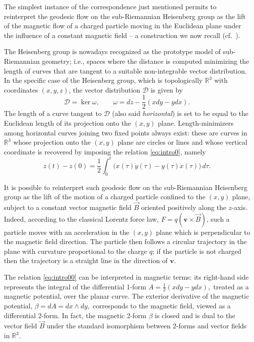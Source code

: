 \documentclass{amsart}
\theoremstyle{plain}
\theoremstyle{definition}
\theoremstyle{remark}
\newcommand{\R}{\mathbb{R}}
\newcommand{\sr}{sub-{R}ie\-man\-nian }
\newcommand{\distr}{\mathcal{D}}								%
\begin{document}
The simplest instance of the correspondence just mentioned permits to reinterpret the geodesic flow on the sub-Riemannian Heisenberg group as the lift of the magnetic flow of a charged particle moving in the Euclidean plane under the influence of a constant magnetic field -- a construction we now recall (cf.\ \cite[Section~4.4.2]{thebook}).


\smallskip
The Heisenberg group is nowadays recognized as the prototype model of \sr geometry; i.e., spaces where the distance is computed minimizing the length of curves that are tangent to a suitable non-integrable vector distribution.  In the specific case of the Heisenberg group, which is topologically $\R^{3}$ with coordinates $(x,y,z)$, the vector distribution $\distr$ is given by
 \begin{equation} \label{eq:intro0}
	\distr=\ker \omega,\qquad \omega=dz-\frac{1}{2}(xdy-ydx). 
 \end{equation}
The length of a curve tangent to $\distr$ (also said \emph{horizontal}) is set to be equal to the Euclidean length of its projection onto the $(x,y)$ plane. Length-minimizers among horizontal curves joining two fixed points always exist: these are curves in $\R^{3}$ whose projection onto the $(x,y)$ plane are circles or lines and whose vertical coordinate is recovered by imposing the relation \eqref{eq:intro0}, namely
 \begin{equation} \label{eq:intro00}
	 z(t)-z(0)=\frac{1}{2}\int_{0}^{t} \big( x(\tau)\dot y(\tau)-y(\tau)\dot x(\tau) \big) \, d\tau. 
 \end{equation}
 


It is possible to reinterpret such geodesic flow on the \sr Heisenberg group as the lift of the motion of a charged particle confined to the \((x,y)\) plane, subject to a constant vector magnetic field \(\vec{B}\) oriented positively along the \(z\)-axis.  
Indeed, according to the classical Lorentz force law,  
$F = q (\mathbf{v} \times \vec{B})$,
such a particle moves with an acceleration in the \((x,y)\)  plane which is perpendicular to the magnetic field direction. The particle then follows a circular trajectory in the plane with curvature proportional to the charge $q$; if the particle is not charged then the trajectory is a straight line in the direction of $\mathbf{v}$.

The relation \eqref{eq:intro00} can be interpreted in magnetic terms: its right-hand side represents the integral of the differential 1-form  
$A = \frac{1}{2} (x dy - y dx),$
treated as a magnetic potential, over the planar curve. The exterior derivative of the magnetic potential,  
$\beta = dA = dx \wedge dy,$
corresponds to the magnetic field, viewed as a differential 2-form. In fact, the magnetic 2-form \(\beta\) is closed and is dual to the vector field \(\vec{B}\) under the standard isomorphism between 2-forms and vector fields in \(\mathbb{R}^{3}\).  
\end{document}
